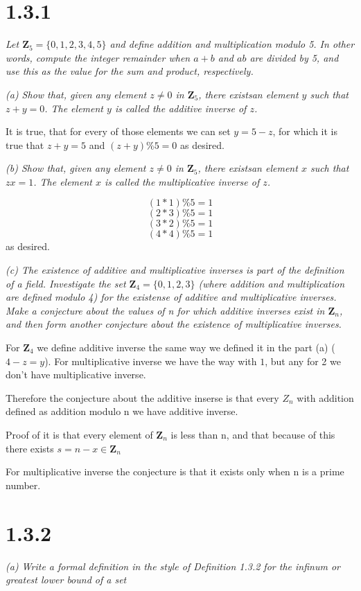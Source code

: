 \documentclass[11pt,oneside,titlepage]{book}
\begin{document}
\section*{1.3.1}
\textit{Let $\textbf{Z}_5 = \{0, 1, 2, 3, 4, 5\}$ and define addition and
  multiplication modulo 5. In other words, compute the integer remainder when
  $a + b$ and $ab$ are divided by 5, and use this as the value for the sum and
  product, respectively.}

\textit{(a) Show that, given any element $z \neq 0$ in $\textbf{Z}_5$, there
  existsan element $y$ such that $z + y = 0$. The element $y$ is called the
  additive inverse of $z$.}

It is true, that for every of those elements we can set $y = 5 - z$, for which
it is true that $z + y = 5$ and $(z + y)\%5 = 0$ as desired.

\textit{(b) Show that, given any element $z \neq 0$ in $\textbf{Z}_5$, there
  existsan element $x$ such that $zx = 1$. The element $x$ is called the
  multiplicative inverse of $z$.}

$$ (1 * 1) \% 5 = 1 $$
$$ (2 * 3) \% 5 = 1 $$
$$ (3 * 2) \% 5 = 1 $$
$$ (4 * 4) \% 5 = 1 $$
as desired.

\textit{(c) The existence of additive and multiplicative inverses is part of
  the definition of a field. Investigate the set $\textbf{Z}_4 = \{0, 1, 2,
  3\}$ (where addition and multiplication are defined modulo 4) for the
  existense of additive and multiplicative inverses. Make a conjecture about
  the values of n for which additive inverses exist in $\textbf{Z}_n$, and then
  form another conjecture about the existence of multiplicative inverses.}

For $\textbf{Z}_4$ we define additive inverse the same way we defined it
in the  part (a) ($4 - z = y$). For multiplicative inverse we have the way
with $1$, but any for 2 we don't have multiplicative inverse.

Therefore the conjecture about the additive inserse is that every $Z_n$ with
addition defined as addition modulo n we have additive inverse.

Proof of it is that every element of $\textbf{Z}_n$  is less than n, and that
because of this there exists $s = n - x \in \textbf{Z}_n$

For multiplicative inverse the conjecture is that it exists only when
n is a prime number.

\section*{1.3.2}
\textit{(a) Write a formal definition in the style of Definition 1.3.2 for the
  infinum or greatest lower bound of a set}
\end{document}
